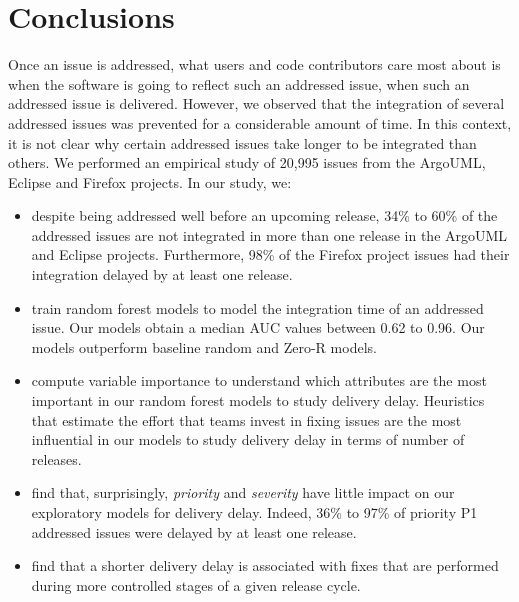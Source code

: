 \section{Conclusions}\label{ch4:conclusion} Once an issue is
addressed, what users and code contributors care most about is when the software
is going to reflect such an addressed issue, \ie when such an addressed issue is
delivered. However, we observed that the integration of several addressed issues
was prevented for a considerable amount of time. In this context, it is not clear why certain
addressed issues take longer to be integrated than others. We performed
an empirical study of 20,995 issues from the ArgoUML, Eclipse and Firefox
projects. In our study, we:
\\
	\begin{itemize}
		\item despite being addressed well before an upcoming release, 34\% to
			60\% of the addressed issues are not integrated in more than one
			release in the ArgoUML and Eclipse projects. Furthermore, 98\%
			of the Firefox project issues had their integration delayed by
			at least one release. \\

		\item train random forest models to model the integration
			time of an addressed issue. Our models obtain a
			median AUC values between 0.62 to 0.96. Our models
			outperform baseline random and Zero-R models. \\

		\item compute variable importance 
			to understand which attributes are the most important in
			our random forest models to study delivery delay.
			Heuristics that estimate the effort that teams invest in
			fixing issues are the most influential in
			our models to study delivery delay in terms of number of
			releases. \\
			
		\item find that, surprisingly, \textit{priority} and
			\textit{severity} have little impact on our exploratory
			models for delivery delay.
			Indeed, 36\% to 97\% of priority P1 addressed issues
			were delayed by at least one release. \\ 

		\item find that a shorter delivery delay is associated with
			fixes that are performed during more controlled stages
			of a given release cycle.\\


\end{itemize}
